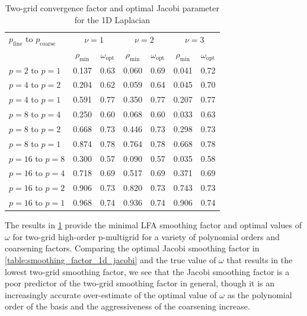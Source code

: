 \documentclass[review]{siamart190516}
\begin{document}
\begin{table}[ht!]
\begin{center}
\begin{tabular}{l cc cc cc}
  \toprule
  $p_{\text{fine}}$ to $p_{\text{coarse}}$  &  \multicolumn{2}{c}{$\nu = 1$}  &  \multicolumn{2}{c}{$\nu = 2$}  &  \multicolumn{2}{c}{$\nu = 3$}  \\
                       &  $\rho_{\min}$ & $\omega_{\text{opt}}$  &  $\rho_{\min}$ & $\omega_{\text{opt}}$  &  $\rho_{\min}$ & $\omega_{\text{opt}}$  \\
  \toprule
  $p = 2$ to $p = 1$   &  0.137 & 0.63  &  0.060 & 0.69  &  0.041 & 0.72   \\
  \midrule
  $p = 4$ to $p = 2$   &  0.204 & 0.62  &  0.059 & 0.64  &  0.045 & 0.70   \\
  $p = 4$ to $p = 1$   &  0.591 & 0.77  &  0.350 & 0.77  &  0.207 & 0.77   \\
  \midrule
  $p = 8$ to $p = 4$   &  0.250 & 0.60  &  0.068 & 0.60  &  0.033 & 0.63   \\
  $p = 8$ to $p = 2$   &  0.668 & 0.73  &  0.446 & 0.73  &  0.298 & 0.73   \\
  $p = 8$ to $p = 1$   &  0.874 & 0.78  &  0.764 & 0.78  &  0.668 & 0.78   \\
  \midrule
  $p = 16$ to $p = 8$  &  0.300 & 0.57  &  0.090 & 0.57  &  0.035 & 0.58   \\
  $p = 16$ to $p = 4$  &  0.718 & 0.69  &  0.517 & 0.69  &  0.371 & 0.69   \\
  $p = 16$ to $p = 2$  &  0.906 & 0.73  &  0.820 & 0.73  &  0.743 & 0.73   \\
  $p = 16$ to $p = 1$  &  0.968 & 0.74  &  0.936 & 0.74  &  0.906 & 0.74   \\
  \bottomrule
\end{tabular}
\end{center}
\caption{Two-grid convergence factor and optimal Jacobi parameter for the 1D Laplacian}
\label{table:two_grid_1d}
\end{table}

The results in \cref{table:two_grid_1d} provide the minimal LFA smoothing factor and optimal values of $\omega$ for two-grid high-order p-multigrid for a variety of polynomial orders and coarsening factors.
Comparing the optimal Jacobi smoothing factor in \cref{table:smoothing_factor_1d_jacobi} and the true value of $\omega$ that results in the lowest two-grid smoothing factor, we see that the Jacobi smoothing factor is a poor predictor of the two-grid smoothing factor in general, though it is an increasingly accurate over-estimate of the optimal value of $\omega$ as the polynomial order of the basis and the aggressiveness of the coarsening increase.
\end{document}
